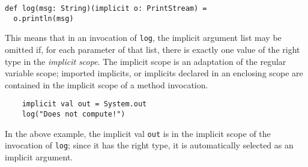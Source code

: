\documentclass[preprint]{sigplanconf}
\newcommand{\ie}{{\em i.e.,~}}
\newcommand{\term}[1]{\mbox{\texttt{#1}}}
\begin{document}
\begin{lstlisting}
def log(msg: String)(implicit o: PrintStream) =
  o.println(msg)
\end{lstlisting}

This means that in an invocation of \term{log}, the implicit argument list may
be omitted if, for each parameter of that list, there is exactly one value of
the right type in the {\em implicit scope}. The implicit scope is an
adaptation of the regular variable scope; imported implicits, or implicits
declared in an enclosing scope are contained in the implicit scope of a method
invocation.

\begin{lstlisting}
    implicit val out = System.out
    log("Does not compute!")
\end{lstlisting}

In the above example, the implicit val \term{out} is in the implicit scope of
the invocation of \term{log}; since it has the right type, it is automatically
selected as an implicit argument.



\begin{comment}
\paragraph{Implicit Conversions.} Implicit conversions can be thought of as
methods which, like implicit parameters, can be implicitly selected (\ie
invoked) based upon their type, and whether or not they are present in
implicit scope. As with implicit parameters, implicit conversions also carry
the \term{implicit} keyword before their declaration.

\begin{lstlisting}
 implicit def intWrapper(x: Int): Message =
    new Message {
      def message: String = "secret message!"
    }
\end{lstlisting}

In the example above, assuming there exists an abstract class \term{Message}
with abstract method \term{message}, the implicit conversion
\term{intWrapper} will be triggered when a method called \term{message}
is called on an \term{Int}. That is, simply calling
\term{39.message} will result in ``secret message!'' being
returned. Since the implicit conversion has the effect of adding a
``new'' method to type \term{Int}, \term{message} is typically called an
{\em extension method}. In our framework we use implicit conversions,
for example, for adding a \term{pickle} method to arbitrary objects.
\end{comment}
\end{document}

